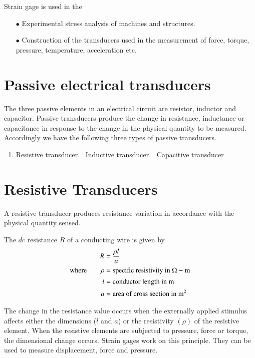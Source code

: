 Strain gage is used in the
\begin{itemize}
\itemsep=2pt
\item[$\bullet$] Experimental stress analysis of machines and structures.

\item[$\bullet$] Construction of the transducers used in the measurement of force, torque, pressure, temperature, acceleration etc.
\end{itemize}

\section{Passive electrical transducers}\label{sec8.7}

The three passive elements in an electrical circuit are resistor, inductor and capacitor. Passive transducers produce the change in resistance, inductance or capacitance in response to the change in the physical quantity to be measured. Accordingly we have the following three types of passive transducers.
\begin{enumerate}
\itemsep=2pt
\item Resistive transducer.~ Inductive transducer.~ Capacitive transducer
\end{enumerate}

\section{Resistive Transducers}\label{sec8.8}

A resistive transducer produces resistance variation in accordance with the physical quantity sensed. 

The $dc$ resistance $R$ of a conducting wire is given by
\begin{align}
R &= \frac{\rho l}{a}\label{eq8.1}\\[1pt]
\text{where}\qquad \rho &= \text{specific resistivity in $\Omega-\text{m}$}\notag\\[1pt]
l &= \text{conductor length in m}\notag\\[1pt]
a &= \text{area of cross section in m$^{2}$}\notag
\end{align}

The change in the resistance value occurs when the externally applied stimulus affects either the dimensions ($l$ and $a$) or the resistivity $(\rho)$ of the resistive element. When the resistive elements are subjected to pressure, force or torque, the dimensional change occurs. Strain gages work on this principle. They can be used to measure displacement, force and pressure.


